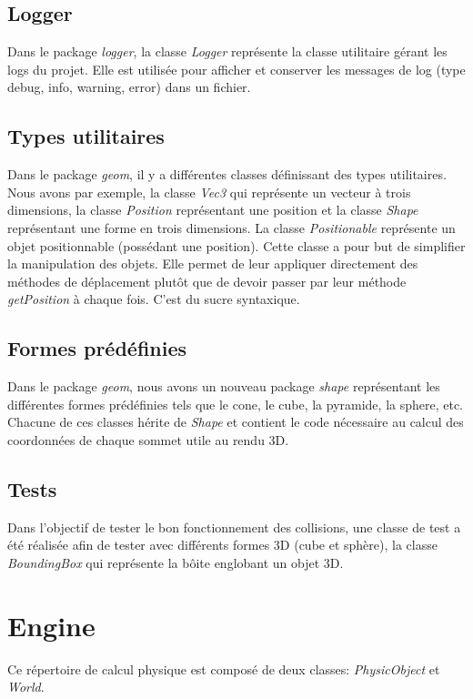 \documentclass[11pt]{report}
\begin{document}
\subsection{Logger}
Dans le package \textit{logger}, la classe \textit{Logger} représente la classe utilitaire gérant les logs du projet. Elle est utilisée pour afficher et conserver les messages de log (type debug, info, warning, error) dans un fichier.

\subsection{Types utilitaires}
Dans le package \textit{geom}, il y a différentes classes définissant des types utilitaires. Nous avons par exemple, la classe \textit{Vec3} qui représente un vecteur à trois dimensions, la classe \textit{Position} représentant une position et la classe \textit{Shape} représentant une forme en trois dimensions. La classe \textit{Positionable} représente un objet positionnable (possédant une position). Cette classe a pour but de simplifier la manipulation des objets. Elle permet de leur appliquer directement des méthodes de déplacement plutôt que de devoir passer par leur méthode \textit{getPosition} à chaque fois. C'est du sucre syntaxique.

\subsection{Formes prédéfinies}
Dans le package \textit{geom}, nous avons un nouveau package \textit{shape} représentant les différentes formes prédéfinies tels que le cone, le cube, la pyramide, la sphere, etc.
Chacune de ces classes hérite de \textit{Shape} et contient le code nécessaire au calcul des coordonnées de chaque sommet utile au rendu 3D.

\subsection{Tests}
Dans l'objectif de tester le bon fonctionnement des collisions, une classe de test a été réalisée afin de tester avec différents formes 3D (cube et sphère), la classe \textit{BoundingBox} qui représente la bôite englobant un objet 3D.

\section{Engine}
Ce répertoire de calcul physique est composé de deux classes: \textit{PhysicObject} et \textit{World}.
\end{document}
